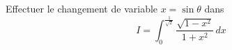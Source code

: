 Effectuer le changement de variable $x=\sin \theta$ dans
\begin{displaymath}
 I=\int_{0}^{\frac{1}{\sqrt{2}}}\frac{\sqrt{1-x^2}}{1+x^2}\,dx
\end{displaymath}
\bigskip \bigskip